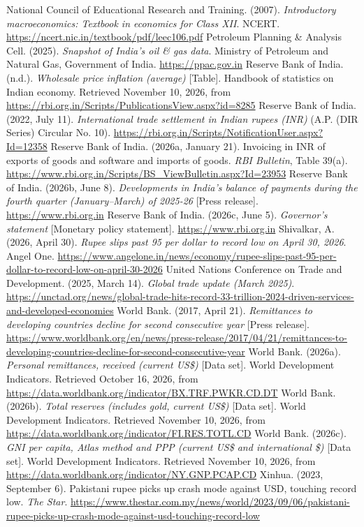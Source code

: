  National Council of Educational Research and Training. (2007). \emph{Introductory macroeconomics: Textbook in economics for Class XII}. NCERT. \url{https://ncert.nic.in/textbook/pdf/leec106.pdf}
 Petroleum Planning \& Analysis Cell. (2025). \emph{Snapshot of India's oil \& gas data}. Ministry of Petroleum and Natural Gas, Government of India. \url{https://ppac.gov.in}
 Reserve Bank of India. (n.d.). \emph{Wholesale price inflation (average)} [Table]. Handbook of statistics on Indian economy. Retrieved November 10, 2026, from \url{https://rbi.org.in/Scripts/PublicationsView.aspx?id=8285}
 Reserve Bank of India. (2022, July 11). \emph{International trade settlement in Indian rupees (INR)} (A.P. (DIR Series) Circular No. 10). \url{https://rbi.org.in/Scripts/NotificationUser.aspx?Id=12358}
 Reserve Bank of India. (2026a, January 21). Invoicing in INR of exports of goods and software and imports of goods. \emph{RBI Bulletin}, Table 39(a). \url{https://www.rbi.org.in/Scripts/BS_ViewBulletin.aspx?Id=23953}
 Reserve Bank of India. (2026b, June 8). \emph{Developments in India’s balance of payments during the fourth quarter (January–March) of 2025-26} [Press release]. \url{https://www.rbi.org.in}
 Reserve Bank of India. (2026c, June 5). \emph{Governor's statement} [Monetary policy statement]. \url{https://www.rbi.org.in}
 Shivalkar, A. (2026, April 30). \emph{Rupee slips past 95 per dollar to record low on April 30, 2026}. Angel One. \url{https://www.angelone.in/news/economy/rupee-slips-past-95-per-dollar-to-record-low-on-april-30-2026}
 United Nations Conference on Trade and Development. (2025, March 14). \emph{Global trade update (March 2025)}. \url{https://unctad.org/news/global-trade-hits-record-33-trillion-2024-driven-services-and-developed-economies}
 World Bank. (2017, April 21). \emph{Remittances to developing countries decline for second consecutive year} [Press release]. \url{https://www.worldbank.org/en/news/press-release/2017/04/21/remittances-to-developing-countries-decline-for-second-consecutive-year}
 World Bank. (2026a). \emph{Personal remittances, received (current US\$)} [Data set]. World Development Indicators. Retrieved October 16, 2026, from \url{https://data.worldbank.org/indicator/BX.TRF.PWKR.CD.DT}
 World Bank. (2026b). \emph{Total reserves (includes gold, current US\$)} [Data set]. World Development Indicators. Retrieved November 10, 2026, from \url{https://data.worldbank.org/indicator/FI.RES.TOTL.CD}
 World Bank. (2026c). \emph{GNI per capita, Atlas method and PPP (current US\$ and international \$)} [Data set]. World Development Indicators. Retrieved November 10, 2026, from \url{https://data.worldbank.org/indicator/NY.GNP.PCAP.CD}
 Xinhua. (2023, September 6). Pakistani rupee picks up crash mode against USD, touching record low. \emph{The Star}. \url{https://www.thestar.com.my/news/world/2023/09/06/pakistani-rupee-picks-up-crash-mode-against-usd-touching-record-low}
